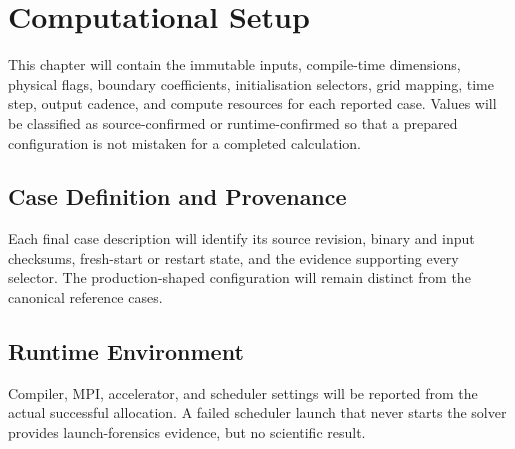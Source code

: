 \chapter{Computational Setup}
\label{ch:computational-setup}

This chapter will contain the immutable inputs, compile-time dimensions,
physical flags, boundary coefficients, initialisation selectors, grid mapping,
time step, output cadence, and compute resources for each reported case.
Values will be classified as source-confirmed or runtime-confirmed so that a
prepared configuration is not mistaken for a completed calculation.

\section{Case Definition and Provenance}

Each final case description will identify its source revision, binary and input
checksums, fresh-start or restart state, and the evidence supporting every
selector. The production-shaped configuration will remain distinct from the
canonical reference cases.

\section{Runtime Environment}

Compiler, MPI, accelerator, and scheduler settings will be reported from the
actual successful allocation. A failed scheduler launch that never starts the
solver provides launch-forensics evidence, but no scientific result.
